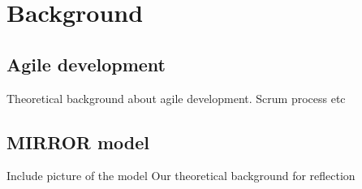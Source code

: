 \chapter{Background}

\section{Agile development}
Theoretical background about agile development. Scrum process etc

\section{MIRROR model}
Include picture of the model
Our theoretical background for reflection